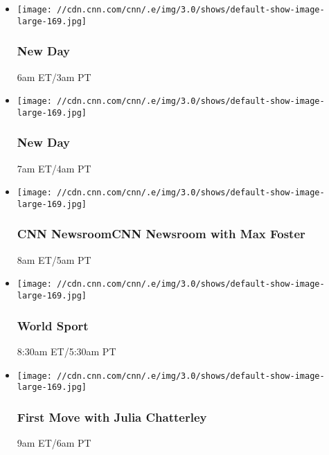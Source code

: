 \begin{itemize}
\item
  \texttt{[image: //cdn.cnn.com/cnn/.e/img/3.0/shows/default-show-image-large-169.jpg]}

  \hypertarget{new-day}{%
  \subsubsection{New Day}\label{new-day}}

  6am ET/3am PT
\end{itemize}

\begin{itemize}
\item
  \texttt{[image: //cdn.cnn.com/cnn/.e/img/3.0/shows/default-show-image-large-169.jpg]}

  \hypertarget{new-day-1}{%
  \subsubsection{New Day}\label{new-day-1}}

  7am ET/4am PT
\end{itemize}

\begin{itemize}
\item
  \texttt{[image: //cdn.cnn.com/cnn/.e/img/3.0/shows/default-show-image-large-169.jpg]}

  \hypertarget{cnn-newsroomcnn-newsroom-with-max-foster-}{%
  \subsubsection{CNN NewsroomCNN Newsroom with Max Foster
  }\label{cnn-newsroomcnn-newsroom-with-max-foster-}}

  8am ET/5am PT
\end{itemize}

\begin{itemize}
\item
  \texttt{[image: //cdn.cnn.com/cnn/.e/img/3.0/shows/default-show-image-large-169.jpg]}

  \hypertarget{world-sport-9}{%
  \subsubsection{World Sport}\label{world-sport-9}}

  8:30am ET/5:30am PT
\end{itemize}

\begin{itemize}
\item
  \texttt{[image: //cdn.cnn.com/cnn/.e/img/3.0/shows/default-show-image-large-169.jpg]}

  \hypertarget{first-move-with-julia-chatterley}{%
  \subsubsection{First Move with Julia
  Chatterley}\label{first-move-with-julia-chatterley}}

  9am ET/6am PT
\end{itemize}

